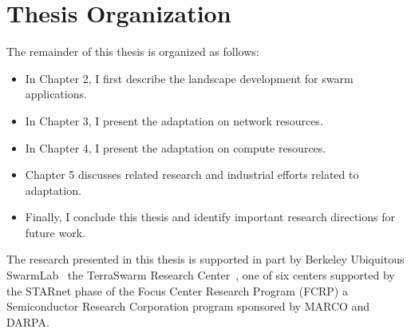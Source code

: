 \documentclass[thesis.tex]{subfiles}
\begin{document}
\section{Thesis Organization}
\label{sec:thesis-organization}

The remainder of this thesis is organized as follows:

\begin{itemize}
\item In Chapter 2, I first describe the landscape development for swarm
  applications.
\item In Chapter 3, I present the adaptation on network resources.
\item In Chapter 4, I present the adaptation on compute resources.
\item Chapter 5 discusses related research and industrial efforts related to
  adaptation.
\item Finally, I conclude this thesis and identify important research directions
  for future work.
\end{itemize}

The research presented in this thesis is supported in part by Berkeley
Ubiquitous SwarmLab~\cite{swarmlab} the TerraSwarm Research
Center~\cite{terraswarm}, one of six centers supported by the STARnet phase of
the Focus Center Research Program (FCRP) a Semiconductor Research Corporation
program sponsored by MARCO and DARPA.
\end{document}

